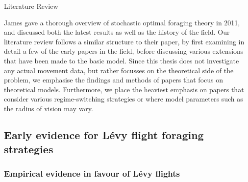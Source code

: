 
\begin{section}{Literature Review \label{sec:litreview}}


\iffalse The search for food is one of the most important factors when investigating animal behaviour, and when considering where an animal travels, it is often the most important factor \cite{}. Animal foraging patterns are often not just patterns of how an animal searches for food, but actually provide insight into an animal's overall movement pattern. The study of how effective an animal's foraging strategy is can act as a very good proxy as to how likely an animal is to survive \cite{}. 

It is this reasoning with which the field of Optimal Foraging Theory hypothesises that animal's should have evolved to use a foraging strategy that is highly optimised. We make it clear that we expect highly optimised models to arise, rather than the most optimal strategy itself, since animal foraging strategies are not indicative of reproduction rate, but rather, the survival rate - and are only a proxy at that.

\fi
James \etal \cite{James_2011} gave a thorough overview of stochastic optimal foraging theory in 2011, and discussed both the latest results as well as the history of the field.
Our literature review follows a similar structure to their paper, by first examining in detail a few of the early papers in the field, before discussing various extensions that have been made to the basic model.
Since this thesis does not investigate any actual movement data, but rather focusses on the theoretical side of the problem, we emphasise the findings and methods of papers that focus on theoretical models. Furthermore, we place the heaviest emphasis on papers that consider various regime-switching strategies or where model parameters such as the radius of vision may vary.

\subsection{Early evidence for L\'{e}vy flight foraging strategies}

\subsubsection{Empirical evidence in favour of L\'{e}vy flights}


\end{section}
